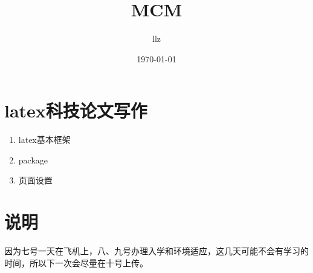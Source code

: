 \documentclass[12pt,a4paper]{article}
\title{MCM}
\author{llz}
\date{\today}
\begin{document}
\kaishu
\maketitle

\section{latex科技论文写作}
\begin{enumerate}
\item{latex基本框架}
\item{package}
\item{页面设置}
\end{enumerate}


\section{说明}
因为七号一天在飞机上，八、九号办理入学和环境适应，这几天可能不会有学习的时间，所以下一次会尽量在十号上传。
\end{document}
